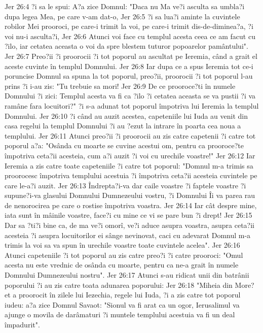 Jer 26:4  ?i sa le spui: A?a zice Domnul: "Daca nu Ma ve?i asculta sa umbla?i dupa legea Mea, pe care v-am dat-o,
Jer 26:5  ?i sa lua?i aminte la cuvintele robilor Mei prooroci, pe care-i trimit la voi, pe care-i trimit dis-de-diminea?a, ?i voi nu-i asculta?i,
Jer 26:6  Atunci voi face cu templul acesta ceea ce am facut cu ?ilo, iar cetatea aceasta o voi da spre blestem tuturor popoarelor pamântului".
Jer 26:7  Preo?ii ?i proorocii ?i tot poporul au ascultat pe Ieremia, când a grait el aceste cuvinte în templul Domnului.
Jer 26:8  Iar dupa ce a spus Ieremia tot ce-i poruncise Domnul sa spuna la tot poporul, preo?ii, proorocii ?i tot poporul l-au prins ?i i-au zis: "Tu trebuie sa mori!
Jer 26:9  De ce prooroce?ti în numele Domnului ?i zici: Templul acesta va fi ca ?ilo ?i cetatea aceasta se va pustii ?i va ramâne fara locuitori?" ?i s-a adunat tot poporul împotriva lui Ieremia la templul Domnului.
Jer 26:10  ?i când au auzit acestea, capeteniile lui Iuda au venit din casa regelui la templul Domnului ?i au ?ezut la intrare în poarta cea noua a templului.
Jer 26:11  Atunci preo?ii ?i proorocii au zis catre capetenii ?i catre tot poporul a?a: "Osânda cu moarte se cuvine acestui om, pentru ca prooroce?te împotriva ceta?ii acesteia, cum a?i auzit ?i voi cu urechile voastre!"
Jer 26:12  Iar Ieremia a zis catre toate capeteniile ?i catre tot poporul: "Domnul m-a trimis sa proorocesc împotriva templului acestuia ?i împotriva ceta?ii acesteia cuvintele pe care le-a?i auzit.
Jer 26:13  Îndrepta?i-va dar caile voastre ?i faptele voastre ?i supune?i-va glasului Domnului Dumnezeului vostru, ?i Domnului Îi va parea rau de nenorocirea pe care o rostise împotriva voastra.
Jer 26:14  Iar cât despre mine, iata sunt în mâinile voastre, face?i cu mine ce vi se pare bun ?i drept!
Jer 26:15  Dar sa ?ti?i bine ca, de ma ve?i omorî, ve?i aduce asupra voastra, asupra ceta?ii acesteia ?i asupra locuitorilor ei sânge nevinovat, caci cu adevarat Domnul m-a trimis la voi sa va spun în urechile voastre toate cuvintele acelea".
Jer 26:16  Atunci capeteniile ?i tot poporul au zis catre preo?i ?i catre prooroci: "Omul acesta nu este vrednic de osânda cu moarte, pentru ca ne-a grait în numele Domnului Dumnezeului nostru".
Jer 26:17  Atunci s-au ridicat unii din batrânii poporului ?i au zis catre toata adunarea poporului:
Jer 26:18  "Miheia din More?et a proorocit în zilele lui Iezechia, regele lui Iuda, ?i a zis catre tot poporul iudeu: a?a zice Domnul Savaot: "Sionul va fi arat ca un ogor, Ierusalimul va ajunge o movila de darâmaturi ?i muntele templului acestuia va fi un deal împadurit".
